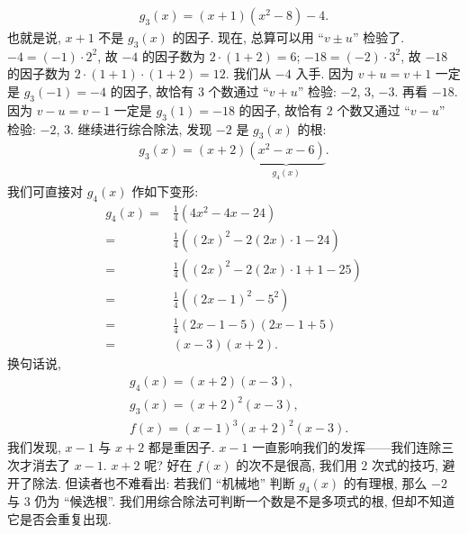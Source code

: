 \begin{example}
    \begin{align*}
        g_3 (x) = (x + 1)(x^2 - 8) - 4.
    \end{align*}
    也就是说, $x+1$ 不是 $g_3 (x)$ 的因子. 现在, 总算可以用 ``$v \pm u$'' 检验了. $-4 = (-1) \cdot 2^2$, 故 $-4$ 的因子数为 $2 \cdot (1+2) = 6$; $-18 = (-2) \cdot 3^2$, 故 $-18$ 的因子数为 $2 \cdot (1+1) \cdot (1+2) = 12$. 我们从 $-4$ 入手. 因为 $v + u = v + 1$ 一定是 $g_3 (-1) = -4$ 的因子, 故恰有 $3$ 个数通过 ``$v + u$'' 检验: $-2$, $3$, $-3$. 再看 $-18$. 因为 $v - u = v - 1$ 一定是 $g_3 (1) = -18$ 的因子, 故恰有 $2$ 个数又通过 ``$v - u$'' 检验: $-2$, $3$. 继续进行综合除法, 发现 $-2$ 是 $g_3 (x)$ 的根:
    \begin{align*}
        g_3 (x) = (x + 2) \underbrace{(x^2 - x - 6)}_{g_4 (x)}.
    \end{align*}
    我们可直接对 $g_4 (x)$ 作如下变形:
    \begin{align*}
        g_4 (x)
        = {} & \frac{1}{4} (4x^2 - 4x - 24)                   \\
        = {} & \frac{1}{4} ((2x)^2 - 2 (2x) \cdot 1 - 24)     \\
        = {} & \frac{1}{4} ((2x)^2 - 2 (2x) \cdot 1 + 1 - 25) \\
        = {} & \frac{1}{4} ((2x - 1)^2 - 5^2)                 \\
        = {} & \frac{1}{4} (2x - 1 - 5) (2x - 1 + 5)          \\
        = {} & (x - 3) (x + 2).
    \end{align*}
    换句话说,
    \begin{align*}
         & g_4 (x) = (x + 2) (x - 3),          \\
         & g_3 (x) = (x + 2)^2 (x - 3),        \\
         & f(x) = (x - 1)^3 (x + 2)^2 (x - 3).
    \end{align*}
    我们发现, $x-1$ 与 $x+2$ 都是重因子. $x-1$ 一直影响我们的发挥——我们连除三次才消去了 $x-1$. $x+2$ 呢? 好在 $f(x)$ 的次不是很高, 我们用 $2$ 次式的技巧, 避开了除法. 但读者也不难看出: 若我们 ``机械地'' 判断 $g_4 (x)$ 的有理根, 那么 $-2$ 与 $3$ 仍为 ``候选根''. 我们用综合除法可判断一个数是不是多项式的根, 但却不知道它是否会重复出现.
\end{example}

